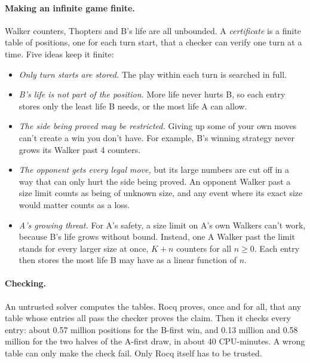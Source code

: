 \documentclass[11pt]{article}
\begin{document}
\paragraph{Making an infinite game finite.} Walker counters, Thopters and
B's life are all unbounded. A \emph{certificate} is a finite table of
positions, one for each turn start, that a checker can verify one turn at
a time. Five ideas keep it finite:
\begin{itemize}
\item \emph{Only turn starts are stored.} The play within each turn is
  searched in full.
\item \emph{B's life is not part of the position.} More life never hurts
  B, so each entry stores only the least life B needs, or the most life A
  can allow.
\item \emph{The side being proved may be restricted.} Giving up some of
  your own moves can't create a win you don't have. For example, B's
  winning strategy never grows its Walker past 4 counters.
\item \emph{The opponent gets every legal move,} but its large numbers
  are cut off in a way that can only hurt the side being proved. An
  opponent Walker past a size limit counts as being of unknown size, and
  any event where its exact size would matter counts as a loss.
\item \emph{A's growing threat.} For A's safety, a size limit on A's own
  Walkers can't work, because B's life grows without bound. Instead, one
  A Walker past the limit stands for every larger size at once, $K+n$
  counters for all $n \ge 0$. Each entry then stores the most life B may
  have as a linear function of $n$.
\end{itemize}

\paragraph{Checking.} An untrusted solver computes the tables. Rocq
proves, once and for all, that any table whose entries all pass the
checker proves the claim. Then it checks every entry: about 0.57 million
positions for the B-first win, and 0.13 million and 0.58 million for the
two halves of the A-first draw, in about 40 CPU-minutes. A wrong table
can only make the check fail. Only Rocq itself has to be trusted.
\end{document}
